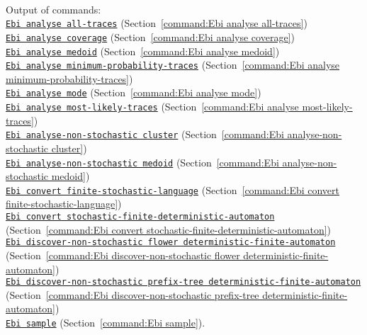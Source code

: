 {\\Output of commands: \\\null\qquad\hyperref[command:Ebi analyse all-traces]{\texttt{Ebi analyse all-traces}} (Section~\ref{command:Ebi analyse all-traces})\\\null\qquad\hyperref[command:Ebi analyse coverage]{\texttt{Ebi analyse coverage}} (Section~\ref{command:Ebi analyse coverage})\\\null\qquad\hyperref[command:Ebi analyse medoid]{\texttt{Ebi analyse medoid}} (Section~\ref{command:Ebi analyse medoid})\\\null\qquad\hyperref[command:Ebi analyse minimum-probability-traces]{\texttt{Ebi analyse minimum-probability-traces}} (Section~\ref{command:Ebi analyse minimum-probability-traces})\\\null\qquad\hyperref[command:Ebi analyse mode]{\texttt{Ebi analyse mode}} (Section~\ref{command:Ebi analyse mode})\\\null\qquad\hyperref[command:Ebi analyse most-likely-traces]{\texttt{Ebi analyse most-likely-traces}} (Section~\ref{command:Ebi analyse most-likely-traces})\\\null\qquad\hyperref[command:Ebi analyse-non-stochastic cluster]{\texttt{Ebi analyse-non-stochastic cluster}} (Section~\ref{command:Ebi analyse-non-stochastic cluster})\\\null\qquad\hyperref[command:Ebi analyse-non-stochastic medoid]{\texttt{Ebi analyse-non-stochastic medoid}} (Section~\ref{command:Ebi analyse-non-stochastic medoid})\\\null\qquad\hyperref[command:Ebi convert finite-stochastic-language]{\texttt{Ebi convert finite-stochastic-language}} (Section~\ref{command:Ebi convert finite-stochastic-language})\\\null\qquad\hyperref[command:Ebi convert stochastic-finite-deterministic-automaton]{\texttt{Ebi convert stochastic-finite-deterministic-automaton}} (Section~\ref{command:Ebi convert stochastic-finite-deterministic-automaton})\\\null\qquad\hyperref[command:Ebi discover-non-stochastic flower deterministic-finite-automaton]{\texttt{Ebi discover-non-stochastic flower deterministic-finite-automaton}} (Section~\ref{command:Ebi discover-non-stochastic flower deterministic-finite-automaton})\\\null\qquad\hyperref[command:Ebi discover-non-stochastic prefix-tree deterministic-finite-automaton]{\texttt{Ebi discover-non-stochastic prefix-tree deterministic-finite-automaton}} (Section~\ref{command:Ebi discover-non-stochastic prefix-tree deterministic-finite-automaton})\\\null\qquad\hyperref[command:Ebi sample]{\texttt{Ebi sample}} (Section~\ref{command:Ebi sample}).
}
